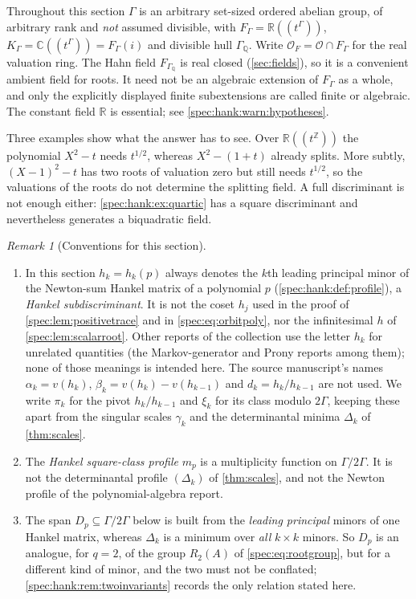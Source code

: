 \documentclass[11pt,a4paper]{article}
\numberwithin{equation}{section}
\theoremstyle{definition}
\theoremstyle{remark}
\newtheorem{remark}[remark]{Remark}
\newcommand{\R}{\mathbb R}
\newcommand{\C}{\mathbb C}
\newcommand{\Q}{\mathbb Q}
\newcommand{\Z}{\mathbb Z}
\newcommand{\OO}{\mathcal O}
\begin{document}
Throughout this section $\Gamma$ is an arbitrary set-sized ordered abelian
group, of arbitrary rank and \emph{not} assumed divisible, with
$F_\Gamma=\R((t^\Gamma))$, $K_\Gamma=\C((t^\Gamma))=F_\Gamma(i)$ and divisible
hull $\Gamma_\Q$. Write $\OO_F=\OO\cap F_\Gamma$ for the real valuation ring.
The Hahn field $F_{\Gamma_\Q}$ is real closed (\cref{sec:fields}), so it is a
convenient ambient field for roots. It need not be an algebraic extension of
$F_\Gamma$ as a whole, and only the explicitly displayed finite subextensions
are called finite or algebraic. The constant field $\R$ is essential; see
\cref{spec:hank:warn:hypotheses}.

Three examples show what the answer has to see. Over $\R((t^\Z))$ the
polynomial $X^2-t$ needs $t^{1/2}$, whereas $X^2-(1+t)$ already splits.
More subtly, $(X-1)^2-t$ has two roots of valuation zero but still needs
$t^{1/2}$, so the valuations of the roots do not determine the splitting
field. A full discriminant is not enough either:
\cref{spec:hank:ex:quartic} has a square discriminant and nevertheless
generates a biquadratic field.

\begin{remark}[Conventions for this section]\label{spec:hank:rem:conventions}
\begin{enumerate}[label=(\alph*)]
\item In this section $h_k=h_k(p)$ always denotes the $k$th leading
principal minor of the Newton-sum Hankel matrix of a polynomial $p$
(\cref{spec:hank:def:profile}), a \emph{Hankel subdiscriminant}. It is not
the coset $h_j$ used in the proof of \cref{spec:lem:positivetrace} and in
\eqref{spec:eq:orbitpoly}, nor the infinitesimal $h$ of
\cref{spec:lem:scalarroot}. Other reports of the collection use the letter
$h_k$ for unrelated quantities (the Markov-generator and Prony reports among
them); none of those meanings is intended here. The source manuscript's
names $\alpha_k=v(h_k)$, $\beta_k=v(h_k)-v(h_{k-1})$ and $d_k=h_k/h_{k-1}$
are not used. We write $\pi_k$ for the pivot $h_k/h_{k-1}$ and $\xi_k$ for its
class modulo $2\Gamma$, keeping these apart from the singular scales
$\gamma_k$ and the determinantal minima $\Delta_k$ of \cref{thm:scales}.
\item The \emph{Hankel square-class profile} $m_p$ is a multiplicity
function on $\Gamma/2\Gamma$. It is not the determinantal profile
$(\Delta_k)$ of \cref{thm:scales}, and not the Newton profile of the
polynomial-algebra report.
\item The span $D_p\subseteq\Gamma/2\Gamma$ below is built from the
\emph{leading principal} minors of one Hankel matrix, whereas $\Delta_k$ is a
minimum over \emph{all} $k\times k$ minors. So $D_p$ is an analogue, for
$q=2$, of the group $R_2(A)$ of \eqref{spec:eq:rootgroup}, but for a different
kind of minor, and the two must not be conflated;
\cref{spec:hank:rem:twoinvariants} records the only relation stated here.
\end{enumerate}
\end{remark}
\end{document}
